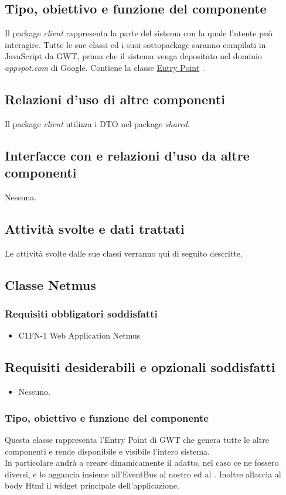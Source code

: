 \subsection*{Tipo, obiettivo e funzione del componente} %
Il package \emph{client} rappresenta la parte del sistema con la quale l'utente
pu\`o interagire. Tutte le sue classi ed i suoi sottopackage saranno compilati in
JavaScript da GWT, prima che il sistema venga depositato nel dominio
\emph{appspot.com} di Google. Contiene la classe \underline{Entry Point}
.
\subsection*{Relazioni d'uso di altre componenti}
Il package \emph{client} utilizza i DTO nel package \emph{shared}.
\subsection*{Interfacce con e relazioni d'uso da altre componenti}
Nessuna.
\subsection*{Attivit\`a svolte e dati trattati}
Le attivit\`a svolte dalle sue classi verranno qui di seguito descritte.

\subsection{Classe Netmus}
\subsubsection*{Requisiti obbligatori soddisfatti}
\begin{itemize}
	\item C1FN-1 Web Application Netmus
\end{itemize}
\subsection*{Requisiti desiderabili e opzionali soddisfatti}
\begin{itemize}
  \item Nessuno.
\end{itemize}
\subsubsection*{Tipo, obiettivo e funzione del componente}
Questa classe rappresenta l'Entry Point di GWT che genera tutte le altre
componenti e rende disponibile e visibile l'intero sistema.\\
In particolare andr\`a a creare dinamicamente il  adatto,
nel caso ce ne fossero diversi, e lo aggancia insieme all'EventBus al nostro
 ed al .
Inoltre allaccia al body Html il widget principale dell'applicazione.
